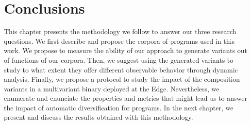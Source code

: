 





\section{Conclusions}

This chapter presents the methodology we follow to answer our three research questions. We first describe and propose the corpora of programs used in this work. We propose to measure the ability of our approach to generate variants out of  functions of our corpora. Then, we suggest using the generated variants to study to what extent they offer different observable behavior through  dynamic analysis. Finally, we propose a protocol to study the impact of the composition variants in a multivariant binary deployed at the Edge. Nevertheless, we enumerate and enunciate the properties and metrics that might lead us to answer the impact of automatic diversification for \wasm programs. In the next chapter, we present and discuss the results obtained with this methodology.